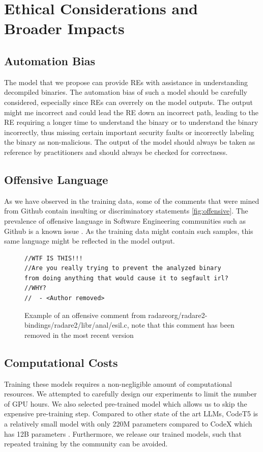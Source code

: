 \section{Ethical Considerations and Broader Impacts}
\subsection{Automation Bias}
The model that we propose can provide REs with assistance in understanding decompiled binaries. The automation bias of such a model should be carefully considered, especially since REs can overrely on the model outputs. The output might me incorrect and could lead the RE down an incorrect path, leading to the RE requiring a longer time to understand the binary or to understand the binary incorrectly, thus missing certain important security faults or incorrectly labeling the binary as non-malicious. The output of the model should always be taken as reference by practitioners and should always be checked for correctness.

\subsection{Offensive Language}
As we have observed in the training data, some of the comments that were mined from Github contain insulting or discriminatory statements \ref{fig:offensive}. The prevalence of offensive language in Software Engineering communities such as Github is a known issue \cite{OffensiveLanguage}. As the training data might contain such samples, this same language might be reflected in the model output. 
\label{fig:offensive}
\begin{figure}[H]
  \centering
\begin{lstlisting}
//WTF IS THIS!!!
//Are you really trying to prevent the analyzed binary 
from doing anything that would cause it to segfault irl?
//WHY?
//	- <Author removed>
\end{lstlisting}
  \caption{Example of an offensive comment from radareorg/radare2-bindings/radare2/libr/anal/esil.c, note that this comment has been removed in the most recent version}
\end{figure}


\subsection{Computational Costs}
Training these models requires a non-negligible amount of computational resources. We attempted to carefully design our experiments to limit the number of GPU hours. We also selected pre-trained model which allows us to skip the expensive pre-training step. Compared to other state of the art LLMs, CodeT5 is a relatively small model with only 220M parameters compared to CodeX which has 12B parameters \cite{CodeX}. Furthermore, we release our trained models, such that repeated training by the community can be avoided.

